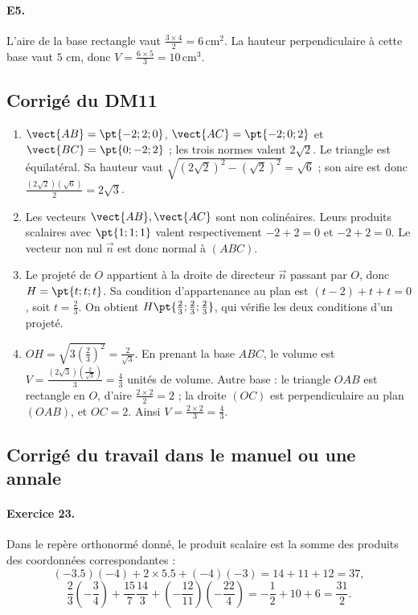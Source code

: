 \paragraph{E5.}L'aire de la base rectangle vaut $\frac{3\times4}{2}=6\,\mathrm{cm}^2$. La hauteur perpendiculaire à cette base vaut $5$ cm, donc $V=\frac{6\times5}{3}=10\,\mathrm{cm}^3$.

\subsection{Corrigé du DM11}\begin{enumerate}
\item $\vect{AB}=\pt{-2;2;0}$, $\vect{AC}=\pt{-2;0;2}$ et $\vect{BC}=\pt{0;-2;2}$ ; les trois normes valent $2\sqrt2$. Le triangle est équilatéral. Sa hauteur vaut $\sqrt{(2\sqrt2)^2-(\sqrt2)^2}=\sqrt6$ ; son aire est donc $\frac{(2\sqrt2)(\sqrt6)}{2}=2\sqrt{3}$.
\item Les vecteurs $\vect{AB},\vect{AC}$ sont non colinéaires. Leurs produits scalaires avec $\pt{1;1;1}$ valent respectivement $-2+2=0$ et $-2+2=0$. Le vecteur non nul $\vec n$ est donc normal à $(ABC)$.
\item Le projeté de $O$ appartient à la droite de directeur $\vec n$ passant par $O$, donc $H=\pt{t;t;t}$. Sa condition d'appartenance au plan est $(t-2)+t+t=0$, soit $t=\frac{2}{3}$. On obtient $H\pt{\frac{2}{3};\frac{2}{3};\frac{2}{3}}$, qui vérifie les deux conditions d'un projeté.
\item $OH=\sqrt{3(\frac{2}{3})^2}=\frac{2}{\sqrt{3}}$. En prenant la base $ABC$, le volume est $V=\frac{(2\sqrt3)(\frac{2}{\sqrt{3}})}{3}=\frac{4}{3}$ unités de volume. Autre base : le triangle $OAB$ est rectangle en $O$, d'aire $\frac{2\times2}{2}=2$ ; la droite $(OC)$ est perpendiculaire au plan $(OAB)$, et $OC=2$. Ainsi $V=\frac{2\times2}{3}=\frac{4}{3}$.
\end{enumerate}

\subsection{Corrigé du travail dans le manuel ou une annale}\paragraph{Exercice 23.} Dans le repère orthonormé donné, le produit scalaire est la somme des produits des coordonnées correspondantes :
\[(-\num{3,5})(-4)+2\times\num{5,5}+(-4)(-3)=14+11+12=37,\]
\[\frac23\left(-\frac34\right)+\frac{15}7\frac{14}3+\left(-\frac{12}{11}\right)\left(-\frac{22}4\right)=-\frac12+10+6=\frac{31}2.\]
